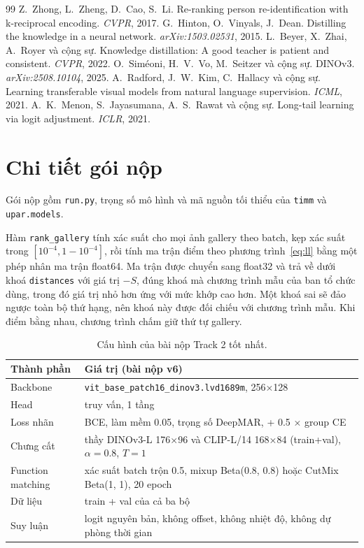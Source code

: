 \documentclass[11pt,a4paper]{article}
\begin{document}
\begin{thebibliography}{99}
 Z.~Zhong, L.~Zheng, D.~Cao, S.~Li. Re-ranking person re-identification with k-reciprocal encoding. \textit{CVPR}, 2017.
 G.~Hinton, O.~Vinyals, J.~Dean. Distilling the knowledge in a neural network. \textit{arXiv:1503.02531}, 2015.
 L.~Beyer, X.~Zhai, A.~Royer và cộng sự. Knowledge distillation: A good teacher is patient and consistent. \textit{CVPR}, 2022.
 O.~Siméoni, H.~V.~Vo, M.~Seitzer và cộng sự. DINOv3. \textit{arXiv:2508.10104}, 2025.
 A.~Radford, J.~W.~Kim, C.~Hallacy và cộng sự. Learning transferable visual models from natural language supervision. \textit{ICML}, 2021.
 A.~K.~Menon, S.~Jayasumana, A.~S.~Rawat và cộng sự. Long-tail learning via logit adjustment. \textit{ICLR}, 2021.
\end{thebibliography}

\appendix
\section{Chi tiết gói nộp}

{\sloppy Gói nộp gồm \texttt{run.py}, trọng số mô hình và mã nguồn tối thiểu của \texttt{timm} và \texttt{upar.models}.\par}
Hàm \texttt{rank\_gallery} tính xác suất cho mọi ảnh gallery theo batch, kẹp xác suất trong $[10^{-4},1-10^{-4}]$, rồi tính ma trận điểm theo phương trình~\eqref{eq:ll} bằng một phép nhân ma trận float64. Ma trận được chuyển sang float32 và trả về dưới khoá \texttt{distances} với giá trị $-S$, đúng khoá mà chương trình mẫu của ban tổ chức dùng, trong đó giá trị nhỏ hơn ứng với mức khớp cao hơn. Một khoá sai sẽ đảo ngược toàn bộ thứ hạng, nên khoá này được đối chiếu với chương trình mẫu. Khi điểm bằng nhau, chương trình chấm giữ thứ tự gallery.

\begin{table}[H]
\centering\small
\begin{tabularx}{\linewidth}{@{}lX@{}}
\toprule
Thành phần & Giá trị (bài nộp v6) \\
\midrule
Backbone & \texttt{vit\_base\_patch16\_dinov3.lvd1689m}, 256×128 \\
Head & truy vấn, 1 tầng \\
Loss nhãn & BCE, làm mềm 0.05, trọng số DeepMAR, + 0.5 × group CE \\
Chưng cất & thầy DINOv3-L 176×96 và CLIP-L/14 168×84 (train+val), $\alpha=0.8$, $T=1$ \\
Function matching & xác suất batch trộn 0.5, mixup Beta(0.8, 0.8) hoặc CutMix Beta(1, 1), 20 epoch \\
Dữ liệu & train + val của cả ba bộ \\
Suy luận & logit nguyên bản, không offset, không nhiệt độ, không dự phòng thời gian \\
\bottomrule
\end{tabularx}
\caption{Cấu hình của bài nộp Track 2 tốt nhất.}
\end{table}
\end{document}

